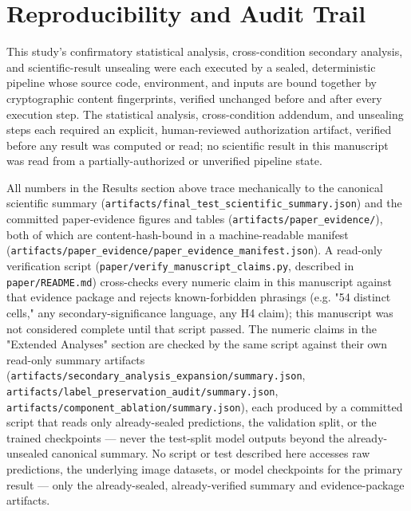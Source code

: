 \section{Reproducibility and Audit Trail}

This study's confirmatory statistical analysis, cross-condition secondary analysis, and scientific-result unsealing were each executed by a sealed, deterministic pipeline whose source code, environment, and inputs are bound together by cryptographic content fingerprints, verified unchanged before and after every execution step. The statistical analysis, cross-condition addendum, and unsealing steps each required an explicit, human-reviewed authorization artifact, verified before any result was computed or read; no scientific result in this manuscript was read from a partially-authorized or unverified pipeline state.

All numbers in the Results section above trace mechanically to the canonical scientific summary (\texttt{artifacts/\allowbreak final\_\allowbreak test\_\allowbreak scientific\_\allowbreak summary.json}) and the committed paper-evidence figures and tables (\texttt{artifacts/\allowbreak paper\_\allowbreak evidence/\allowbreak }), both of which are content-hash-bound in a machine-readable manifest (\texttt{artifacts/\allowbreak paper\_\allowbreak evidence/\allowbreak paper\_\allowbreak evidence\_\allowbreak manifest.json}). A read-only verification script (\texttt{paper/\allowbreak verify\_\allowbreak manuscript\_\allowbreak claims.py}, described in \texttt{paper/\allowbreak README.md}) cross-checks every numeric claim in this manuscript against that evidence package and rejects known-forbidden phrasings (e.g. "54 distinct cells," any secondary-significance language, any H4 claim); this manuscript was not considered complete until that script passed. The numeric claims in the "Extended Analyses" section are checked by the same script against their own read-only summary artifacts (\texttt{artifacts/\allowbreak secondary\_\allowbreak analysis\_\allowbreak expansion/\allowbreak summary.json}, \texttt{artifacts/\allowbreak label\_\allowbreak preservation\_\allowbreak audit/\allowbreak summary.json}, \texttt{artifacts/\allowbreak component\_\allowbreak ablation/\allowbreak summary.json}), each produced by a committed script that reads only already-sealed predictions, the validation split, or the trained checkpoints --- never the test-split model outputs beyond the already-unsealed canonical summary. No script or test described here accesses raw predictions, the underlying image datasets, or model checkpoints for the primary result --- only the already-sealed, already-verified summary and evidence-package artifacts.


